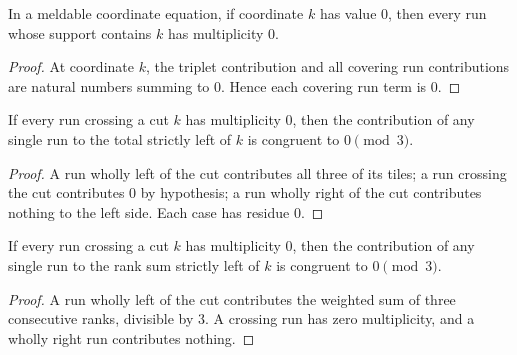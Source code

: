 \begin{lemma}

  \label{lem:run_eq_zero_of_zero_coord}
  In a meldable coordinate equation, if coordinate \(k\) has value \(0\),
  then every run whose support contains \(k\) has multiplicity \(0\).
\end{lemma}
\begin{proof}

\leanok
  At coordinate \(k\), the triplet contribution and all covering run
  contributions are natural numbers summing to \(0\).  Hence each
  covering run term is \(0\).
\end{proof}

\begin{lemma}

  \label{lem:run_left_count_mod}
  If every run crossing a cut \(k\) has multiplicity \(0\), then the
  contribution of any single run to the total strictly left of \(k\) is
  congruent to \(0\pmod3\).
\end{lemma}
\begin{proof}

\leanok
  A run wholly left of the cut contributes all three of its tiles; a run
  crossing the cut contributes \(0\) by hypothesis; a run wholly right of
  the cut contributes nothing to the left side.  Each case has residue
  \(0\).
\end{proof}

\begin{lemma}

  \label{lem:run_left_rank_mod}
  If every run crossing a cut \(k\) has multiplicity \(0\), then the
  contribution of any single run to the rank sum strictly left of \(k\)
  is congruent to \(0\pmod3\).
\end{lemma}
\begin{proof}

\leanok
  A run wholly left of the cut contributes the weighted sum of three
  consecutive ranks, divisible by \(3\).  A crossing run has zero
  multiplicity, and a wholly right run contributes nothing.
\end{proof}

